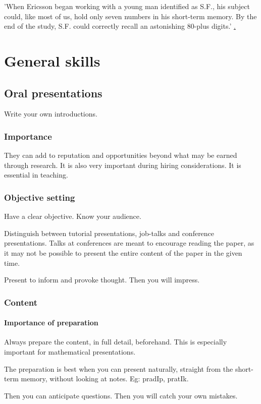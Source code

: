 \documentclass[oneside, article]{memoir}
\begin{document}
'When Eric­sson began working with a young man identified as S.F., his subject could, like most of us, hold only seven numbers in his short-term memory. By the end of the study, S.F. could correctly recall an astonishing 80-plus digits.' \href{http://www.nytimes.com/2010/03/21/books/review/Paul-t.html?ref=books}.

\part{General skills}
\chapter{Oral presentations}
Write your own introductions.

\section{Importance}
They can add to reputation and opportunities beyond what may be earned through research. It is also very important during hiring considerations. It is essential in teaching.

\section{Objective setting}
Have a clear objective. Know your audience.

Distinguish between tutorial presentations, job-talks and conference presentations. Talks at conferences are meant to encourage reading the paper, as it may not be possible to present the entire content of the paper in the given time.

Present to inform and provoke thought. Then you will impress.

\section{Content}
\subsection{Importance of preparation}
Always prepare the content, in full detail, beforehand. This is especially important for mathematical presentations.

The preparation is best when you can present naturally, straight from the short-term memory, without looking at notes. Eg: pradIp, pratIk.

Then you can anticipate questions. Then you will catch your own mistakes.
\end{document}
